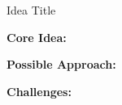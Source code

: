 \begin{idea}{Idea Title}


\textbf{Core Idea:}  

\textbf{Possible Approach:}

\textbf{Challenges:}



\end{idea}